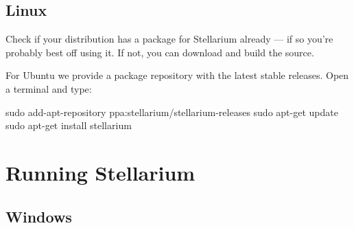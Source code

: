 \subsection{Linux}

Check if your distribution has a package for Stellarium already --- if
so you're probably best off using it. If not, you can download and build
the source.

For Ubuntu we provide a package repository with the latest stable
releases. Open a terminal and type:

\begin{commands}
sudo add-apt-repository ppa:stellarium/stellarium-releases
sudo apt-get update
sudo apt-get install stellarium
\end{commands}


\section{Running Stellarium}
\label{sec:GettingStarted:Running}

\subsection{Windows}
\label{sec:GettingStarted:Running:Windows}

